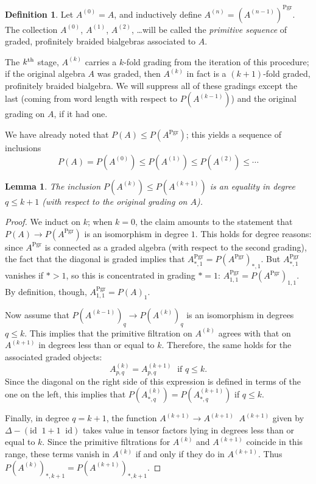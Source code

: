 \documentclass[12pt]{article}
\DeclareMathOperator{\Pgr}{Pgr}
\DeclareMathOperator{\hattimes}{\widehat{\otimes}}
\newcommand{\id}{\mbox{id}}
\newcommand{\nth}{\textsuperscript{th}}
\theoremstyle{plain}
\newtheorem{lem}[thm]{Lemma}
\theoremstyle{definition}
\newtheorem{defn}[thm]{Definition}
\theoremstyle{remark}
\begin{document}
\begin{defn}

Let $A^{(0)} = A$, and inductively define $A^{(n)} = (A^{(n-1)})^{\Pgr}$.  The collection $A^{(0)}$, $A^{(1)}$, $A^{(2)}$, \dots will be called the \emph{primitive sequence} of graded, profinitely braided bialgebras associated to $A$.

\end{defn}

The $k\nth$ stage, $A^{(k)}$ carries a $k$-fold grading from the iteration of this procedure; if the original algebra $A$ was graded, then $A^{(k)}$ in fact is a $(k+1)$-fold graded, profinitely braided bialgebra.  We will suppress all of these gradings except the last (coming from word length with respect to $P(A^{(k-1)})$) and the original grading on $A$, if it had one.

We have already noted that $P(A) \leq P(A^{\Pgr})$; this yields a sequence of inclusions
%
$$P(A) = P(A^{(0)}) \leq P(A^{(1)}) \leq P(A^{(2)}) \leq \cdots$$

\begin{lem}

The inclusion $P(A^{(k)}) \leq P(A^{(k+1)})$ is an equality in degree $q \leq k+1$ (with respect to the original grading on $A$).

\end{lem}

\begin{proof}

We induct on $k$; when $k=0$, the claim amounts to the statement that $P(A) \to P(A^{\Pgr})$ is an isomorphism in degree $1$.  This holds for degree reasons: since $A^{\Pgr}$ is connected as a graded algebra (with respect to the second grading), the fact that the diagonal is graded implies that $A^{\Pgr}_{*, 1} = P(A^{\Pgr})_{*, 1}$.  But $A^{\Pgr}_{*, 1}$ vanishes if $*>1$, so this is concentrated in grading $*=1$: $A^{\Pgr}_{1, 1} = P(A^{\Pgr})_{1, 1}$.  By definition, though, $A^{\Pgr}_{1, 1} = P(A)_1$.

Now assume that $P(A^{(k-1)})_q \to P(A^{(k)})_q$ is an isomorphism in degrees $q \leq k$.  This implies that the primitive filtration on $A^{(k)}$ agrees with that on $A^{(k+1)}$ in degrees less than or equal to $k$.  Therefore, the same holds for the associated graded objects:
%
$$A^{(k)}_{p, q} = A^{(k+1)}_{p, q} \; \mbox{ if $q \leq k$.}$$
%
Since the diagonal on the right side of this expression is defined in terms of the one on the left, this implies that $P(A^{(k)}_{*, q}) = P(A^{(k+1)}_{*, q})$ if $q \leq k$.

Finally, in degree $q=k+1$, the function $A^{(k+1)} \to A^{(k+1)} \hattimes A^{(k+1)}$ given by $\Delta - (\id \hattimes 1 + 1 \hattimes \id)$ takes value in tensor factors lying in degrees less than or equal to $k$.  Since the primitive filtrations for $A^{(k)}$ and $A^{(k+1)}$ coincide in this range, these terms vanish in $A^{(k)}$ if and only if they do in $A^{(k+1)}$.  Thus $P(A^{(k)})_{*, k+1} = P(A^{(k+1)})_{*, k+1}$.

\end{proof}
\end{document}
